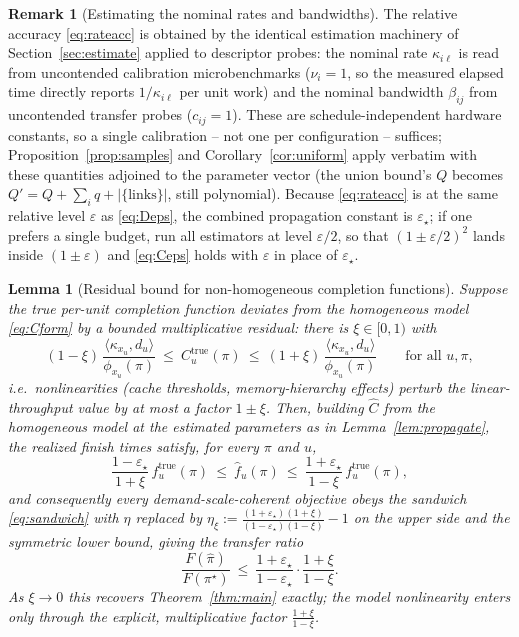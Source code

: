 \documentclass{amsart}
\newtheorem{lemma}{Lemma}
\theoremstyle{definition}
\newtheorem{remark}{Remark}
\newcommand{\Chat}{\widehat{C}}
\begin{document}
\begin{remark}[Estimating the nominal rates and bandwidths]\label{rem:rates}
The relative accuracy \eqref{eq:rateacc} is obtained by the identical
estimation machinery of Section~\ref{sec:estimate} applied to descriptor
probes: the nominal rate $\kappa_{i\ell}$ is read from uncontended calibration
microbenchmarks ($\nu_i=1$, so the measured elapsed time directly reports
$1/\kappa_{i\ell}$ per unit work) and the nominal bandwidth $\beta_{ij}$ from
uncontended transfer probes ($c_{ij}=1$). These are schedule-independent
hardware constants, so a single calibration -- not one per configuration --
suffices; Proposition~\ref{prop:samples} and Corollary~\ref{cor:uniform} apply
verbatim with these quantities adjoined to the parameter vector (the union
bound's $Q$ becomes $Q'=Q+\sum_i q+|\{\text{links}\}|$, still polynomial).
Because \eqref{eq:rateacc} is at the same relative level $\varepsilon$ as
\eqref{eq:Deps}, the combined propagation constant is $\varepsilon_\star$; if one
prefers a single budget, run all estimators at level $\varepsilon/2$, so that
$(1\pm\varepsilon/2)^2$ lands inside $(1\pm\varepsilon)$ and \eqref{eq:Ceps}
holds with $\varepsilon$ in place of $\varepsilon_\star$.
\end{remark}

\begin{lemma}[Residual bound for non-homogeneous completion functions]\label{lem:lipschitz}
Suppose the true per-unit completion function deviates from the homogeneous
model \eqref{eq:Cform} by a bounded multiplicative residual: there is
$\xi\in[0,1)$ with
\[
(1-\xi)\,\frac{\langle\kappa_{x_u},d_u\rangle}{\phi_{x_u}(\pi)}
\ \le\ C_u^{\mathrm{true}}(\pi)\ \le\
(1+\xi)\,\frac{\langle\kappa_{x_u},d_u\rangle}{\phi_{x_u}(\pi)}
\qquad\text{for all }u,\pi,
\]
i.e.\ nonlinearities (cache thresholds, memory-hierarchy effects) perturb the
linear-throughput value by at most a factor $1\pm\xi$. Then, building $\Chat$
from the homogeneous model at the estimated parameters as in
Lemma~\ref{lem:propagate}, the realized finish times satisfy, for every $\pi$
and $u$,
\[
\frac{1-\varepsilon_\star}{1+\xi}\,f_u^{\mathrm{true}}(\pi)
\ \le\ \widehat f_u(\pi)\ \le\
\frac{1+\varepsilon_\star}{1-\xi}\,f_u^{\mathrm{true}}(\pi),
\]
and consequently every demand-scale-coherent objective obeys the sandwich
\eqref{eq:sandwich} with $\eta$ replaced by
$\eta_\xi:=\frac{(1+\varepsilon_\star)(1+\xi)}{(1-\varepsilon_\star)(1-\xi)}-1$
on the upper side and the symmetric lower bound, giving the transfer ratio
\[
\frac{F(\hat\pi)}{F(\pi^\star)}\ \le\
\frac{1+\varepsilon_\star}{1-\varepsilon_\star}\cdot\frac{1+\xi}{1-\xi}.
\]
As $\xi\to0$ this recovers Theorem~\ref{thm:main} exactly; the model nonlinearity
enters only through the explicit, multiplicative factor $\frac{1+\xi}{1-\xi}$.
\end{lemma}
\end{document}
